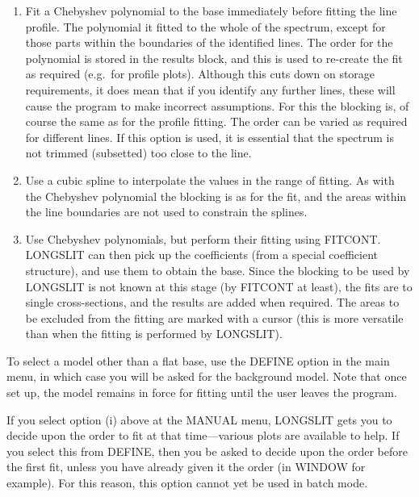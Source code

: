 \documentclass[11pt,twoside]{article}
\begin{document}
\begin{enumerate}

\item Fit a Chebyshev polynomial to the base immediately before fitting
the line profile.  The polynomial it fitted to the whole of the
spectrum, except for those parts within the boundaries of the
identified lines.  The order for the polynomial is stored in the
results block, and this is used to re-create the fit as required
(e.g.\ for profile plots).  Although this cuts down on storage
requirements, it does mean that if you identify any further lines,
these will cause the program to make incorrect assumptions.  For this
the blocking is, of course the same as for the profile fitting.  The
order can be varied as required for different lines.  If this option is
used, it is essential that the spectrum is not trimmed (subsetted) too
close to the line.

\item Use a cubic spline to interpolate the values in the range of
fitting.  As with the Chebyshev polynomial the blocking is as for the
fit, and the areas within the line boundaries are not used to constrain
the splines.

\item Use Chebyshev polynomials, but perform their fitting using
FITCONT.  LONGSLIT can then pick up the coefficients (from a special
coefficient structure), and use them to obtain the base.  Since the
blocking to be used by LONGSLIT is not known at this stage (by FITCONT
at least), the fits are to single cross-sections, and the results are
added when required.  The areas to be excluded from the fitting are
marked with a cursor (this is more versatile than when the fitting is
performed by LONGSLIT).

\end{enumerate}

To select a model other than a flat base, use the DEFINE option in the
main menu, in which case you will be asked for the background model.
Note that once set up, the model remains in force for fitting until the
user leaves the program.

If you select option (i) above at the MANUAL menu, LONGSLIT gets you to
decide upon the order to fit at that time---various plots are available
to help.
If you select this from DEFINE, then you be asked to decide upon the
order before the first fit, unless you have already given it the order
(in WINDOW for example).
For this reason, this option cannot yet be used in batch mode.
\end{document}
